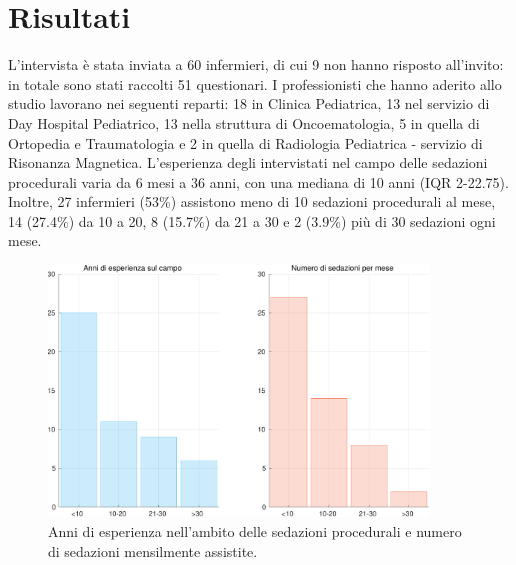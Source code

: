 \chapter{Risultati}

L'intervista è stata inviata a 60 infermieri, di cui 9 non hanno risposto all'invito: in totale sono stati raccolti 51 questionari. I professionisti che hanno aderito allo studio lavorano nei seguenti reparti: 18 in Clinica Pediatrica, 13 nel servizio di Day Hospital Pediatrico, 13 nella struttura di Oncoematologia, 5 in quella di Ortopedia e Traumatologia e 2 in quella di Radiologia Pediatrica - servizio di Risonanza Magnetica. L'esperienza degli intervistati nel campo delle sedazioni procedurali varia da 6 mesi a 36 anni, con una mediana di 10 anni (IQR 2-22.75). Inoltre, 27 infermieri (53$\%$) assistono meno di 10 sedazioni procedurali al mese, 14 (27.4$\%$) da 10 a 20, 8 (15.7$\%$) da 21 a 30 e 2 (3.9$\%$) più di 30 sedazioni ogni mese. 

\begin{figure}[h]
    \centering
    \includegraphics[width=0.9\textwidth]{Figure/esperienzaVSfrequenza.pdf}
    \caption{Anni di esperienza nell'ambito delle sedazioni procedurali e numero di sedazioni mensilmente assistite.}
    \label{fig:esperienzavsfrequenza}
\end{figure}


